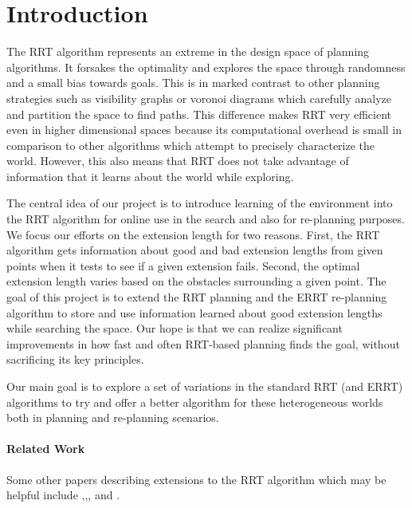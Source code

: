 \documentclass[10pt,twoside,twocolumn]{article}
\begin{document}
\maketitle

\section{Introduction} 
The RRT algorithm represents an extreme in the design space of planning algorithms.  
It forsakes the optimality and explores the space through randomness and a small bias towards goals.  This is in marked contrast to other planning strategies such as visibility graphs or voronoi diagrams which carefully analyze and partition the space to find paths.  
This difference makes RRT very efficient even in higher dimensional spaces because its computational overhead is small in comparison to other algorithms which attempt to precisely characterize the world.  However, this also means that RRT does not take advantage of information that it learns about the world while exploring.

The central idea of our project is to introduce learning of the environment into the RRT algorithm for online use in the search and also for re-planning purposes.  We focus our efforts on the extension length for two reasons.  First, the RRT algorithm gets information about good and bad extension lengths from given points when it tests to see if a given extension fails.  Second, the optimal extension length varies based on the obstacles surrounding a given point.  The goal of this project is to extend the RRT planning and the ERRT re-planning algorithm to store and use information learned about good extension lengths while searching the space.  Our hope is that we can realize significant improvements in how fast and often RRT-based planning finds the goal, without sacrificing its key principles.

Our main goal is to explore a set of variations in the standard RRT (and ERRT) algorithms to try and offer a better algorithm for these heterogeneous worlds both in planning and re-planning scenarios.

\paragraph{Related Work}

Some other papers describing extensions to the RRT algorithm which may be helpful include \cite{Lavalle98rapidly-exploringrandom},\cite{Lindemann04incrementallyreducing},\cite{Jaillet05adaptivetuning}, and \cite{moplan2009}.
\end{document}
